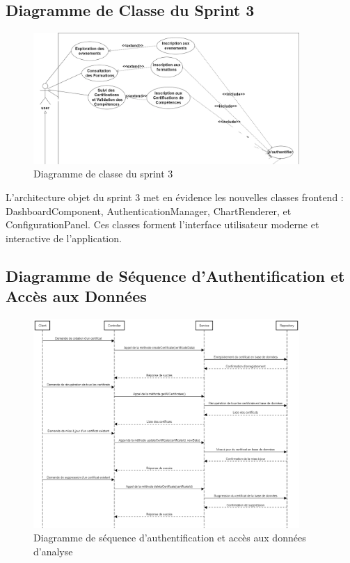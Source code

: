 \subsection{Diagramme de Classe du Sprint 3}

\begin{figure}[H]
\centering
\includegraphics[width=0.9\textwidth]{assets/images/sprint3-usecase.png}
\caption{Diagramme de classe du sprint 3}
\label{fig:sprint3-class}
\end{figure}

L'architecture objet du sprint 3 met en évidence les nouvelles classes frontend : DashboardComponent, AuthenticationManager, ChartRenderer, et ConfigurationPanel. Ces classes forment l'interface utilisateur moderne et interactive de l'application.

\subsection{Diagramme de Séquence d'Authentification et Accès aux Données}

\begin{figure}[H]
\centering
\includegraphics[width=0.9\textwidth]{assets/images/seq-certifs.png}
\caption{Diagramme de séquence d'authentification et accès aux données d'analyse}
\label{fig:auth-data-sequence}
\end{figure}

